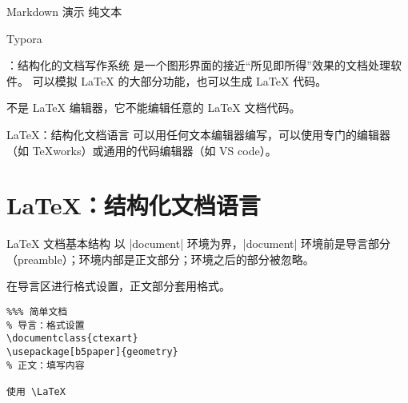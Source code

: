 \begin{frame}{Markdown 演示}
纯文本

Typora
\end{frame}

\begin{frame}{\LyX{}：结构化的文档写作系统}
\LyX{} 是一个图形界面的接近“所见即所得”效果的文档处理软件。\LyX{} 可以模拟 \LaTeX{} 的大部分功能，也可以生成 \LaTeX{} 代码。

\LyX{} 不是 \LaTeX{} 编辑器，它不能编辑任意的 \LaTeX{} 文档代码。
\end{frame}

\begin{frame}{\LaTeX{}：结构化文档语言}
可以用任何文本编辑器编写，可以使用专门的编辑器（如 TeXworks）或通用的代码编辑器（如 VS code）。
\end{frame}

\section{\LaTeX{}：结构化文档语言}

\begin{frame}[fragile]{\LaTeX{} 文档基本结构}
以 |document| 环境为界，|document| 环境前是导言部分（preamble）；环境内部是正文部分；环境之后的部分被忽略。

在导言区进行格式设置，正文部分套用格式。\pause

\begin{Verbatim}
%%% 简单文档
% 导言：格式设置
\documentclass{ctexart}
\usepackage[b5paper]{geometry}
% 正文：填写内容

使用 \LaTeX

\end{Verbatim}

\end{frame}


